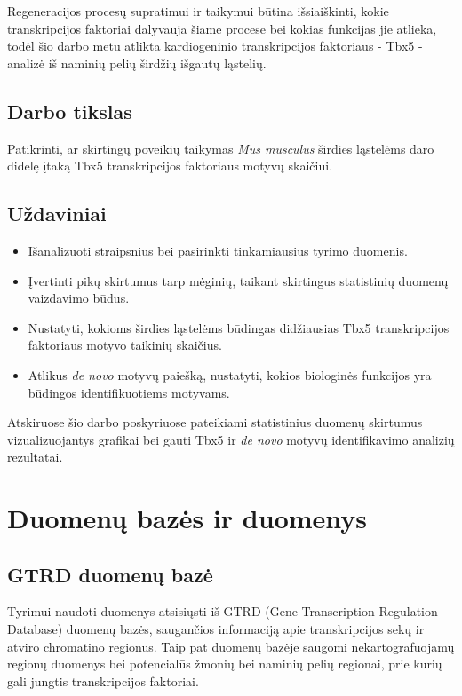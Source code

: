 \documentclass[12pt]{article}
\begin{document}
Regeneracijos procesų supratimui ir taikymui būtina išsiaiškinti, kokie
transkripcijos faktoriai dalyvauja šiame procese bei kokias funkcijas jie
atlieka, todėl šio darbo metu atlikta kardiogeninio transkripcijos
faktoriaus - Tbx5 - analizė iš naminių pelių širdžių išgautų ląstelių.

\subsection*{Darbo tikslas}

Patikrinti, ar skirtingų poveikių taikymas \emph{Mus musculus} širdies
ląstelėms daro didelę įtaką Tbx5 transkripcijos faktoriaus motyvų skaičiui.

\subsection*{Uždaviniai}
\begin{itemize}
    \item Išanalizuoti straipsnius bei pasirinkti tinkamiausius tyrimo duomenis.
    \item Įvertinti pikų skirtumus tarp mėginių, taikant skirtingus statistinių
        duomenų vaizdavimo būdus.
    \item Nustatyti, kokioms širdies ląstelėms būdingas didžiausias Tbx5
        transkripcijos faktoriaus motyvo taikinių skaičius.
    \item Atlikus \emph{de novo} motyvų paiešką, nustatyti, kokios biologinės
        funkcijos yra būdingos identifikuotiems motyvams.
\end{itemize}

Atskiruose šio darbo poskyriuose pateikiami statistinius duomenų skirtumus
vizualizuojantys grafikai bei gauti Tbx5 ir \emph{de novo} motyvų
identifikavimo analizių rezultatai.

\newpage


\section{Duomenų bazės ir duomenys}
\subsection{GTRD duomenų bazė}
Tyrimui naudoti duomenys atsisiųsti iš GTRD (Gene Transcription Regulation
Database)\cite{GTRD} duomenų bazės, saugančios informaciją apie transkripcijos
sekų ir atviro chromatino regionus. Taip pat duomenų bazėje saugomi
nekartografuojamų regionų duomenys bei potencialūs žmonių bei naminių pelių
regionai, prie kurių gali jungtis transkripcijos faktoriai.
\end{document}
